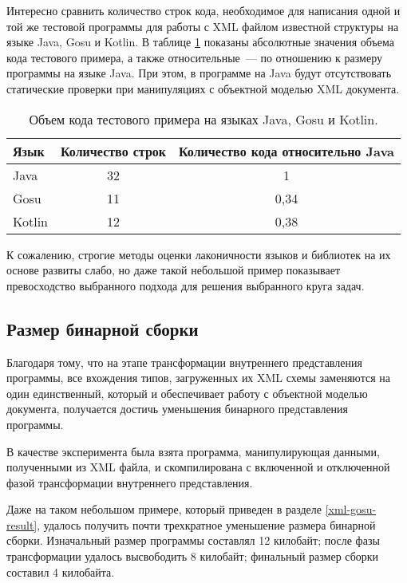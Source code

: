 Интересно сравнить количество строк кода, необходимое для написания одной и той же тестовой программы для работы с XML файлом известной структуры на языке Java, Gosu и Kotlin. В таблице \ref{tab:comparation_java_gosu_kotlin} показаны абсолютные значения объема кода тестового примера, а также относительные~--- по отношению к размеру программы на языке Java.
При этом, в программе на Java будут отсутствовать статические проверки при манипуляциях с объектной моделью XML документа.


\begin{table}[!h]\begin{center}
\begin{center}
    \begin{tabular}{ | l | c | c | }
    \hline
    Язык 	& Количество строк & Количество кода относительно Java \\ \hline
    Java 	& 32 	& 1 \\ \hline
    Gosu   	& 11 	& 0,34  \\ \hline
    Kotlin 	& 12 	& 0,38 \\
    \hline
    \end{tabular}
\end{center}
\caption{Объем кода тестового примера на языках Java, Gosu и Kotlin.}
\label{tab:comparation_java_gosu_kotlin}
\end{center}
\end{table}

К сожалению, строгие методы оценки лаконичности языков и библиотек на их основе развиты слабо, но даже такой небольшой пример показывает превосходство выбранного подхода для решения выбранного круга задач.

\subsection{Размер бинарной сборки}
Благодаря тому, что на этапе трансформации внутреннего представления программы, все вхождения типов, загруженных их XML схемы заменяются на один единственный, который и обеспечивает работу с объектной моделью документа, получается достичь уменьшения бинарного представления программы.

В качестве эксперимента была взята программа, манипулирующая данными, полученными из XML файла, и скомпилирована с включенной и отключенной фазой трансформации внутреннего представления.

Даже на таком небольшом примере, который приведен в разделе \ref{xml-gosu-result}, удалось получить почти трехкратное уменьшение размера бинарной сборки. Изначальный размер программы составлял 12 килобайт; после фазы трансформации удалось высвободить 8 килобайт; финальный размер сборки составил 4 килобайта.

